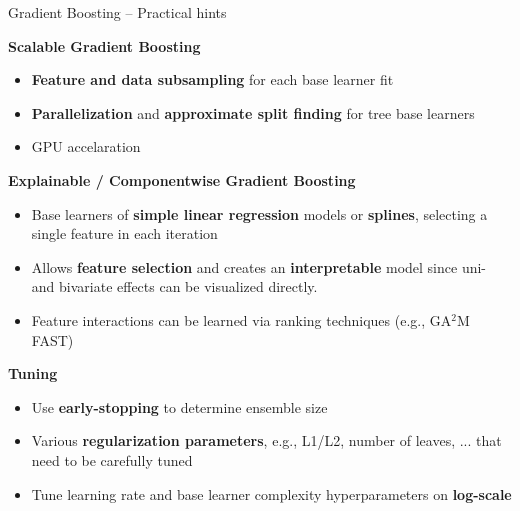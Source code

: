 \documentclass[11pt,compress,t,notes=noshow, xcolor=table]{beamer}
\newcommand{\highlight}[1]{\textcolor{hlcol}{\textbf{#1}}}
\begin{document}
\begin{frame2}{Gradient Boosting -- Practical hints}
  \footnotesize

\highlight{Scalable Gradient Boosting} 

\begin{itemize}
  \item \textbf{Feature and data subsampling} for each base learner fit
  \item \textbf{Parallelization} and \textbf{approximate split finding} for tree base learners
  \item GPU accelaration
\end{itemize}


\highlight{Explainable / Componentwise Gradient Boosting}
\begin{itemize}
    \item Base learners of \textbf{simple linear regression} models or \textbf{splines}, selecting a single feature in each iteration
    \item Allows \textbf{feature selection} and creates an \textbf{interpretable} model since uni- and bivariate effects can be visualized directly.
    \item Feature interactions can be learned via ranking techniques (e.g., GA$^2$M FAST)
\end{itemize}


\highlight{Tuning}
\begin{itemize}
    \item Use \textbf{early-stopping} to determine ensemble size
    \item Various \textbf{regularization parameters}, e.g., L1/L2, number of leaves, ... that need to be carefully tuned
    \item Tune learning rate and base learner complexity hyperparameters on \textbf{log-scale}
\end{itemize}

\end{frame2}
\end{document}
